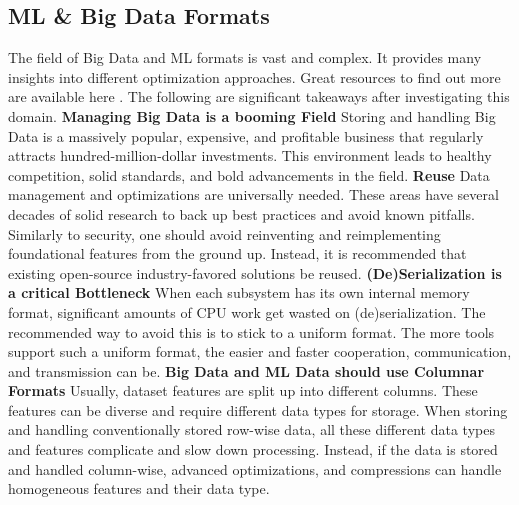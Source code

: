 \subsection{ML \& Big Data Formats}

The field of Big Data and ML formats is vast and complex.
It provides many insights into different optimization approaches.
Great resources to find out more are available here \cite{influxdb_apache_stack,apache_arrow_flight_sql_2022,columnar_roadmap_parquet_and_arrow,apache_arrow_flight_intro}.
The following are significant takeaways after investigating this domain.
\vspace{5mm}
\newline
\textbf{Managing Big Data is a booming Field}\newline
Storing and handling Big Data is a massively popular, expensive, and profitable business that regularly attracts hundred-million-dollar investments.
This environment leads to healthy competition, solid standards, and bold advancements in the field.
\vspace{5mm}
\newline
\textbf{Reuse}\newline
Data management and optimizations are universally needed.
These areas have several decades of solid research to back up best practices and avoid known pitfalls.
Similarly to security, one should avoid reinventing and reimplementing foundational features from the ground up.
Instead, it is recommended that existing open-source industry-favored solutions be reused.
\vspace{5mm}
\newline
\textbf{(De)Serialization is a critical Bottleneck}\newline
When each subsystem has its own internal memory format, significant amounts of CPU work get wasted on (de)serialization.
The recommended way to avoid this is to stick to a uniform format.
The more tools support such a uniform format, the easier and faster cooperation, communication, and transmission can be.
\vspace{5mm}
\newline
\textbf{Big Data and ML Data should use Columnar Formats}\newline
Usually, dataset features are split up into different columns.
These features can be diverse and require different data types for storage.
When storing and handling conventionally stored row-wise data, all these different data types and features complicate and slow down processing.
Instead, if the data is stored and handled column-wise, advanced optimizations, and compressions can handle homogeneous features and their data type.
